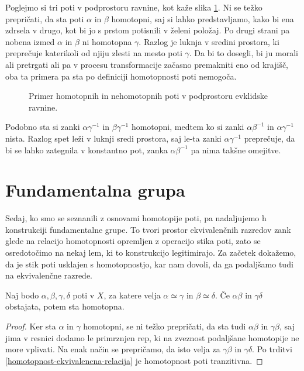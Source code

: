 \documentclass[11pt, a4paper]{article}
\begin{document}
\begin{zgled}
    Poglejmo si tri poti v podprostoru ravnine, kot kaže slika \ref{homotopija-poti}. Ni se težko prepričati, da sta poti $\alpha$ in $\beta$ homotopni, saj si lahko predstavljamo, kako bi ena zdrsela v drugo, kot bi jo s prstom potisnili v želeni položaj. Po drugi strani pa nobena izmed $\alpha$ in $\beta$ ni homotopna $\gamma$. Razlog je luknja v sredini prostora, ki preprečuje katerikoli od njiju zlesti na mesto poti $\gamma$. Da bi to dosegli, bi ju morali ali pretrgati ali pa v procesu transformacije začasno premakniti eno od krajišč, oba ta primera pa sta po definiciji homotopnosti poti nemogoča.

    \begin{figure}[H]
        \centering
        
        \caption{Primer homotopnih in nehomotopnih poti v podprostoru evklidske ravnine.}
        \label{homotopija-poti}
    \end{figure}

    Podobno sta si zanki $\alpha\gamma^{-1}$ in $\beta\gamma^{-1}$ homotopni, medtem ko si zanki $\alpha\beta^{-1}$ in $\alpha\gamma^{-1}$ nista. Razlog spet leži v luknji sredi prostora, saj le-ta zanki $\alpha\gamma^{-1}$ preprečuje, da bi se lahko zategnila v konstantno pot, zanka $\alpha\beta^{-1}$ pa nima takšne omejitve.
    \label{homotopija-poti-v-podprostoru-R2}
\end{zgled}


\section{Fundamentalna grupa}


Sedaj, ko smo se seznanili z osnovami homotopije poti, pa nadaljujemo h konstrukciji fundamentalne grupe. To tvori prostor ekvivalenčnih razredov zank glede na relacijo homotopnosti opremljen z operacijo stika poti, zato se osredotočimo na nekaj lem, ki to konstrukcijo legitimirajo. Za začetek dokažemo, da je stik poti usklajen s homotopnostjo, kar nam dovoli, da ga podaljšamo tudi na ekvivalenčne razrede.


\begin{lema}
    Naj bodo $\alpha, \beta, \gamma, \delta$ poti v $X$, za katere velja $\alpha \simeq \gamma$ in $\beta \simeq \delta$. Če $\alpha\beta$ in $\gamma\delta$ obstajata, potem sta homotopna.
    \label{stik-poti-homotopen}
\end{lema}


\begin{proof}
    Ker sta $\alpha$ in $\gamma$ homotopni, se ni težko prepričati, da sta tudi $\alpha\beta$ in $\gamma\beta$, saj jima v resnici dodamo le primrznjen rep, ki na zveznost podaljšane homotopije ne more vplivati. Na enak način se prepričamo, da isto velja za $\gamma\beta$ in $\gamma\delta$. Po trditvi \ref{homotopnost-ekvivalencna-relacija} je homotopnost poti tranzitivna.
\end{proof}
\end{document}
